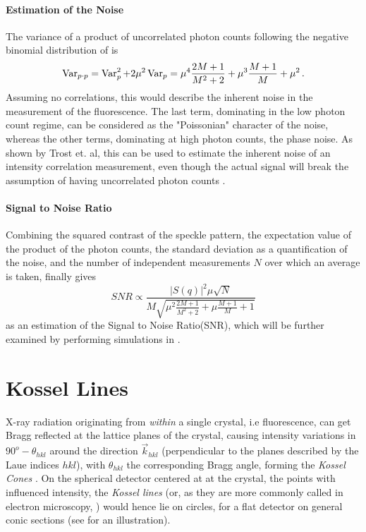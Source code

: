 \paragraph{Estimation of the Noise}
The variance of a product of uncorrelated photon counts following the negative binomial distribution of  is
\begin{equation}
	\operatorname{Var}_{p\cdot p}= \operatorname{Var}_p^2 +2 \mu^2\operatorname{Var}_p	= \mu^4 \frac{2 M + 1}{M^2 + 2}+ \mu^3 \frac{M+1}{M} + \mu^2 \,.
\end{equation}
Assuming no correlations, this would describe the inherent noise in the measurement of the fluorescence. The last term, dominating in the low photon count regime, can be considered as the "Poissonian" character of the noise, whereas the other terms, dominating at high photon counts, the phase noise.
As shown by Trost et. al, this can be used to estimate the inherent noise of an intensity correlation measurement, even though the actual signal will break the assumption of having uncorrelated photon counts \cite{trost2020}.

\paragraph{Signal to Noise Ratio}
Combining the squared contrast of the speckle pattern, the expectation value of the product of the photon counts, the standard deviation as a quantification of the noise, and the number of independent measurements $N$ over which an average is taken, finally gives 
\begin{equation}
SNR\propto  \frac{|S(q)|^2 \mu\sqrt{N}}{M\sqrt{\mu^2 \frac{2 M + 1}{M^2 + 2}+ \mu \frac{M+1}{M} + 1}}
\label{eq:snr}
\end{equation}
as an estimation of the Signal to Noise Ratio(SNR), which will be further examined by performing simulations in .





\section{Kossel Lines}
\label{sec:kossel}
X-ray radiation  originating from \textit{within} a single crystal, i.e fluorescence, can get Bragg reflected at the lattice planes of the crystal, causing intensity variations in $90^o-\theta_{hkl}$ around the direction $\vec{k}_{hkl}$ (perpendicular to the planes described by the Laue indices $hkl$), with $\theta_{hkl}$ the corresponding Bragg angle, forming the \textit{Kossel Cones} \cite{cowley1995}. On the spherical detector centered at at the crystal, the points with influenced intensity, the \textit{Kossel lines} (or, as they are more commonly called in electron microscopy, ) would hence lie on circles, for a flat detector on general conic sections (see  for an illustration).

